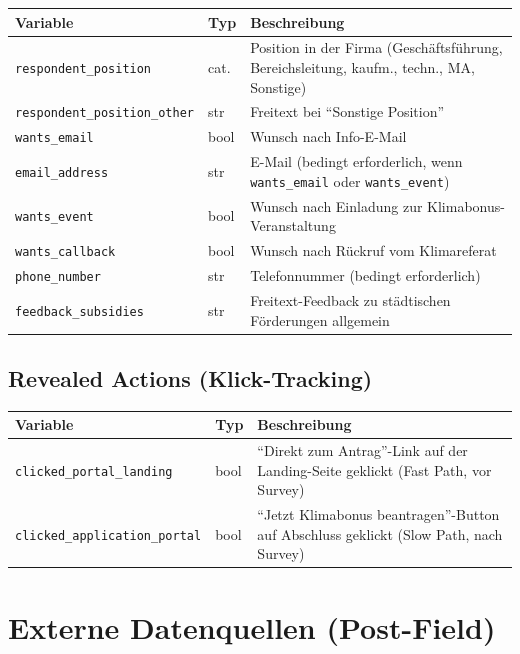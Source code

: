\documentclass[11pt, a4paper]{scrartcl}
\newcommand{\var}[1]{\texttt{\small #1}}
\begin{document}
\begin{longtable}{@{}p{3.6cm} p{2.0cm} p{9.5cm}@{}}
\toprule
\textbf{Variable} & \textbf{Typ} & \textbf{Beschreibung} \\
\midrule
\endhead
\var{respondent\_position}        & cat. & Position in der Firma (Geschäftsführung, Bereichsleitung, kaufm., techn., MA, Sonstige) \\
\var{respondent\_position\_other} & str  & Freitext bei \enquote{Sonstige Position} \\
\var{wants\_email}                & bool & Wunsch nach Info-E-Mail \\
\var{email\_address}              & str  & E-Mail (bedingt erforderlich, wenn \var{wants\_email} oder \var{wants\_event}) \\
\var{wants\_event}                & bool & Wunsch nach Einladung zur Klimabonus-Veranstaltung \\
\var{wants\_callback}             & bool & Wunsch nach Rückruf vom Klimareferat \\
\var{phone\_number}               & str  & Telefonnummer (bedingt erforderlich) \\
\var{feedback\_subsidies}         & str  & Freitext-Feedback zu städtischen Förderungen allgemein \\
\bottomrule
\end{longtable}

\subsection{Revealed Actions (Klick-Tracking)}

\begin{longtable}{@{}p{3.8cm} p{2.0cm} p{9.3cm}@{}}
\toprule
\textbf{Variable} & \textbf{Typ} & \textbf{Beschreibung} \\
\midrule
\endhead
\var{clicked\_portal\_landing}        & bool  & \enquote{Direkt zum Antrag}-Link auf der Landing-Seite geklickt (Fast Path, vor Survey) \\
\var{clicked\_application\_portal}    & bool  & \enquote{Jetzt Klimabonus beantragen}-Button auf Abschluss geklickt (Slow Path, nach Survey) \\
\bottomrule
\end{longtable}

\section{Externe Datenquellen (Post-Field)}
\end{document}
